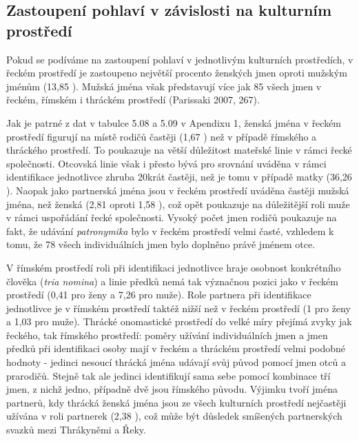 \subsection[zastoupení-pohlaví-v-závislosti-na-kulturním-prostředí]{Zastoupení pohlaví v závislosti na kulturním prostředí}

Pokud se podíváme na zastoupení pohlaví v jednotlivým kulturních prostředích, v řeckém prostředí je zastoupeno největší procento ženských jmen oproti mužským jménům (13,85 ). Mužská jména však představují více jak 85  všech jmen v řeckém, římském i thráckém prostředí (Parissaki 2007, 267).

Jak je patrné z dat v tabulce 5.08 a 5.09 v Apendixu 1, ženská jména v řeckém prostředí figurují na místě rodičů častěji (1,67 ) než v případě římského a thráckého prostředí. To poukazuje na větší důležitost mateřské linie v rámci řecké společnosti. Otcovská linie však i přesto bývá pro srovnání uváděna v rámci identifikace jednotlivce zhruba 20krát častěji, než je tomu v případě matky (36,26 ). Naopak jako partnerská jména jsou v řeckém prostředí uváděna častěji mužská jména, než ženská (2,81  oproti 1,58 ), což opět poukazuje na důležitější roli muže v rámci uspořádání řecké společnosti. Vysoký počet jmen rodičů poukazuje na fakt, že udávání {\em patronymika} bylo v řeckém prostředí velmi časté, vzhledem k tomu, že 78  všech individuálních jmen bylo doplněno právě jménem otce.

V římském prostředí roli při identifikaci jednotlivce hraje osobnost konkrétního člověka ({\em tria nomina}) a linie předků nemá tak význačnou pozici jako v řeckém prostředí (0,41  pro ženy a 7,26  pro muže). Role partnera při identifikace jednotlivce je v římském prostředí taktéž nižší než v řeckém prostředí (1  pro ženy a 1,03  pro muže). Thrácké onomastické prostředí do velké míry přejímá zvyky jak řeckého, tak římského prostředí: poměry užívání individuálních jmen a jmen předků při identifikaci osoby mají v řeckém a thráckém prostředí velmi podobné hodnoty - jedinci nesoucí thrácká jména udávají svůj původ pomocí jmen otců a prarodičů. Stejně tak ale jedinci identifikují sama sebe pomocí kombinace tří jmen, z nichž jedno, případně dvě jsou římského původu. Výjimku tvoří jména partnerů, kdy thrácká ženská jména jsou ze všech kulturních prostředí nejčastěji užívána v roli partnerek (2,38 ), což může být důsledek smíšených partnerských svazků mezi Thrákyněmi a Řeky.

